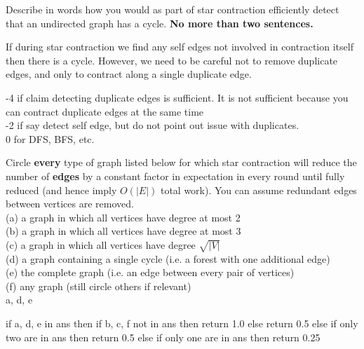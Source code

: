 %

\begin{problem}
\ask
Describe in words how you would as part of star contraction 
efficiently detect that an undirected graph has a cycle.  \textbf{No more than two sentences.}

\sol
If during star contraction we find any self edges not involved in
contraction itself then there is a cycle.   However,
we need to be careful not to remove duplicate edges, and only to
contract along a single duplicate edge.

-4 if claim detecting duplicate edges is sufficient.  It is not sufficient because you can contract duplicate edges at the same time\\
%
-2 if say detect self edge, but do not point out issue with duplicates.\\
%
0 for DFS, BFS, etc.
\end{problem}


%
%
\begin{problem}
\ask
Circle \textbf{every} type of graph listed below for which star
contraction will reduce the number of \textbf{edges} by a constant
factor in expectation in every round until fully reduced (and hence
imply $O(|E|)$ total work).  You can assume redundant edges between
vertices are removed.\\

(a) a graph in which all vertices have degree at most 2\\
(b) a graph in which all vertices have degree at most 3\\
(c) a graph in which all vertices have degree $\sqrt{|V|}$\\
(d) a graph containing a single cycle (i.e. a forest with one additional edge)\\
(e) the complete graph (i.e. an edge between every pair of vertices)\\
(f) any graph (still circle others if relevant)\\

\sol
a, d, e

\algoc

\algog 
if a, d, e in ans then
    if b, c, f not in ans then
        return 1.0
    else 
        return 0.5
else if only two are in ans then
    return 0.5
else if only one are in ans then
    return 0.25
\end{problem}


